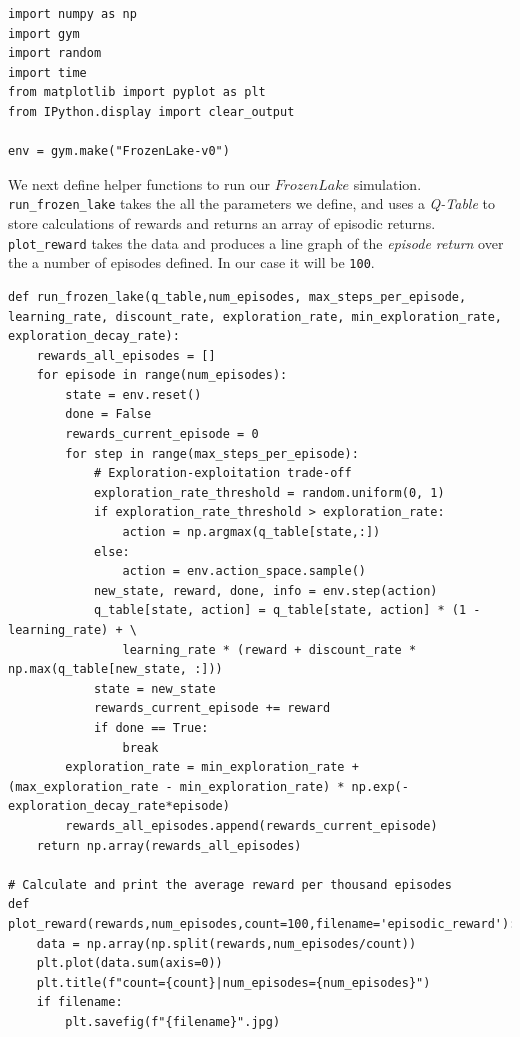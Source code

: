 \documentclass[12pt, letterpaper]{article}
\begin{document}
\begin{mdframed}[backgroundcolor=shadecolor]
\begin{verbatim}
import numpy as np
import gym
import random
import time
from matplotlib import pyplot as plt
from IPython.display import clear_output

env = gym.make("FrozenLake-v0")
\end{verbatim}
\end{mdframed}

We next define helper functions to run our $FrozenLake$ simulation. \texttt{run\_frozen\_lake} takes the all the parameters we define, and uses a \textit{Q-Table} to store calculations of rewards and returns an array of episodic returns. \texttt{plot\_reward} takes the data and produces a line graph of the \textit{episode return} over the a number of episodes defined. In our case it will be \texttt{100}.

\begin{mdframed}[backgroundcolor=shadecolor]
\begin{verbatim}
def run_frozen_lake(q_table,num_episodes, max_steps_per_episode, learning_rate, discount_rate, exploration_rate, min_exploration_rate, exploration_decay_rate):
    rewards_all_episodes = []
    for episode in range(num_episodes):
        state = env.reset()
        done = False
        rewards_current_episode = 0
        for step in range(max_steps_per_episode):
            # Exploration-exploitation trade-off
            exploration_rate_threshold = random.uniform(0, 1)
            if exploration_rate_threshold > exploration_rate:
                action = np.argmax(q_table[state,:]) 
            else:
                action = env.action_space.sample()
            new_state, reward, done, info = env.step(action)
            q_table[state, action] = q_table[state, action] * (1 - learning_rate) + \
                learning_rate * (reward + discount_rate * np.max(q_table[new_state, :]))
            state = new_state
            rewards_current_episode += reward
            if done == True:
                break
        exploration_rate = min_exploration_rate + (max_exploration_rate - min_exploration_rate) * np.exp(-exploration_decay_rate*episode)
        rewards_all_episodes.append(rewards_current_episode)
    return np.array(rewards_all_episodes)

# Calculate and print the average reward per thousand episodes
def plot_reward(rewards,num_episodes,count=100,filename='episodic_reward'):
    data = np.array(np.split(rewards,num_episodes/count))
    plt.plot(data.sum(axis=0))
    plt.title(f"count={count}|num_episodes={num_episodes}")
    if filename:
        plt.savefig(f"{filename}".jpg)
\end{verbatim}
\end{mdframed}
\end{document}
